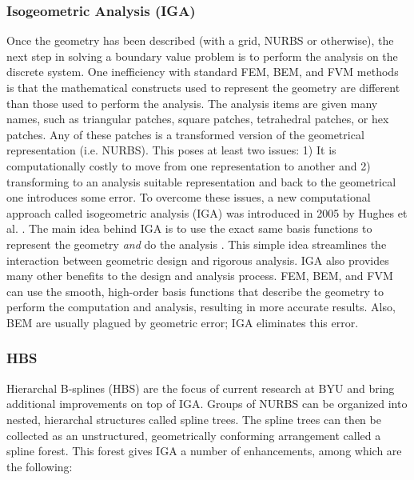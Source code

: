     \subsubsection{Isogeometric Analysis (IGA)} \label{ssub:isogeometric_analysis_iga}

      Once the geometry has been described (with a grid, NURBS or otherwise), the next step in solving a boundary value problem is to perform the analysis on the discrete system. One inefficiency with standard FEM, BEM, and FVM methods is that the mathematical constructs used to represent the geometry are different than those used to perform the analysis. The analysis items are given many names, such as triangular patches, square patches, tetrahedral patches, or hex patches. Any of these patches is a transformed version of the geometrical representation (i.e. NURBS). This poses at least two issues: 1) It is computationally costly to move from one representation to another and 2) transforming to an analysis suitable representation and back to the geometrical one introduces some error.
      To overcome these issues, a new computational approach called isogeometric analysis (IGA) was introduced in 2005 by Hughes et al. \cite{hughes2005}. The main idea behind IGA is to use the exact same basis functions to represent the geometry \textit{and} do the analysis \cite{scott2013}. This simple idea streamlines the interaction between geometric design and rigorous analysis. IGA also provides many other benefits to the design and analysis process. FEM, BEM, and FVM  can use the smooth, high-order basis functions that describe the geometry to perform the computation and analysis, resulting in more accurate results. Also, BEM are usually plagued by geometric error; IGA eliminates this error. 

      \subsubsection{HBS} \label{ssub:hbs}

        Hierarchal B-splines (HBS)  are the focus of current research at BYU and bring additional improvements on top of IGA. Groups of NURBS can be organized into nested, hierarchal structures called spline trees.  The spline trees can then be collected as an unstructured, geometrically conforming arrangement called a spline forest. This forest gives IGA a number of enhancements, among which are the following:

